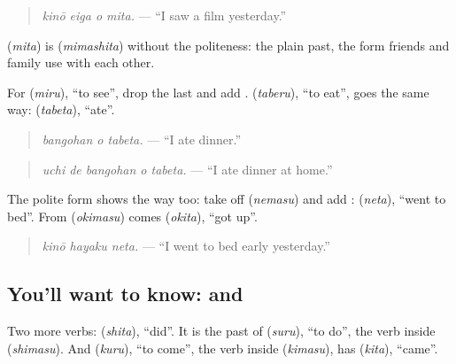 \begin{quote}
\emph{kinō eiga o mita.} — \textquotedblleft{}I saw a film yesterday.\textquotedblright{}
\end{quote}

\textbf{} (\emph{mita}) is \textbf{} (\emph{mimashita}) without the politeness: the plain past, the form friends and family use with each other.

For \textbf{} (\emph{miru}), \textquotedblleft{}to see\textquotedblright{}, drop the last \textbf{} and add \textbf{}. \textbf{} (\emph{taberu}), \textquotedblleft{}to eat\textquotedblright{}, goes the same way: \textbf{} (\emph{tabeta}), \textquotedblleft{}ate\textquotedblright{}.

\begin{quote}
\textbf{ }
\end{quote}

\begin{quote}
\emph{bangohan o tabeta.} — \textquotedblleft{}I ate dinner.\textquotedblright{}
\end{quote}

\begin{quote}
\textbf{  }
\end{quote}

\begin{quote}
\emph{uchi de bangohan o tabeta.} — \textquotedblleft{}I ate dinner at home.\textquotedblright{}
\end{quote}

The polite form shows the way too: take \textbf{} off \textbf{} (\emph{nemasu}) and add \textbf{}: \textbf{} (\emph{neta}), \textquotedblleft{}went to bed\textquotedblright{}. From \textbf{} (\emph{okimasu}) comes \textbf{} (\emph{okita}), \textquotedblleft{}got up\textquotedblright{}.

\begin{quote}
\textbf{  }
\end{quote}

\begin{quote}
\emph{kinō hayaku neta.} — \textquotedblleft{}I went to bed early yesterday.\textquotedblright{}
\end{quote}

\subsection*{You'll want to know:  and }
Two more verbs: \textbf{} (\emph{shita}), \textquotedblleft{}did\textquotedblright{}. It is the past of \textbf{} (\emph{suru}), \textquotedblleft{}to do\textquotedblright{}, the verb inside \textbf{} (\emph{shimasu}). And \textbf{} (\emph{kuru}), \textquotedblleft{}to come\textquotedblright{}, the verb inside \textbf{} (\emph{kimasu}), has \textbf{} (\emph{kita}), \textquotedblleft{}came\textquotedblright{}.

